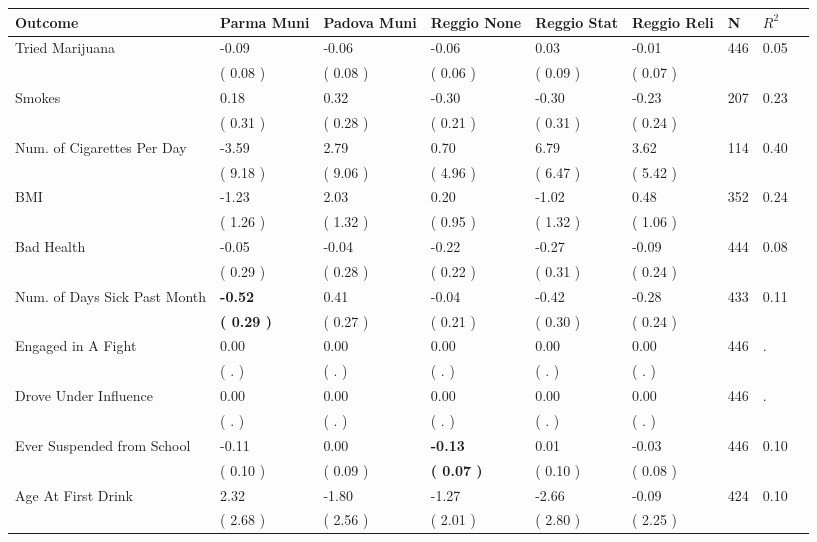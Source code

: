 \begin{tabular}{L{6.2cm} C{1.8cm} C{1.8cm} C{1.8cm} C{1.8cm} C{1.8cm} C{1.8cm} C{0.3cm} C{0.3cm}}
\toprule
 \textbf{Outcome} & \textbf{Parma Muni} & \textbf{Padova Muni} & \textbf{Reggio None} & \textbf{Reggio Stat} & \textbf{Reggio Reli} & \textbf{N} & \textbf{$ R^2$} \\
\midrule
Tried Marijuana &     -0.09 &     -0.06 &     -0.06 &      0.03 &     -0.01  & 446 &       0.05 \\ 
 & (     0.08 ) & (     0.08 ) & (     0.06 ) & (     0.09 ) & (     0.07 )  & \\
Smokes &      0.18 &      0.32 &     -0.30 &     -0.30 &     -0.23  & 207 &       0.23 \\ 
 & (     0.31 ) & (     0.28 ) & (     0.21 ) & (     0.31 ) & (     0.24 )  & \\
Num. of Cigarettes Per Day &     -3.59 &      2.79 &      0.70 &      6.79 &      3.62  & 114 &       0.40 \\ 
 & (     9.18 ) & (     9.06 ) & (     4.96 ) & (     6.47 ) & (     5.42 )  & \\
BMI &     -1.23 &      2.03 &      0.20 &     -1.02 &      0.48  & 352 &       0.24 \\ 
 & (     1.26 ) & (     1.32 ) & (     0.95 ) & (     1.32 ) & (     1.06 )  & \\
Bad Health &     -0.05 &     -0.04 &     -0.22 &     -0.27 &     -0.09  & 444 &       0.08 \\ 
 & (     0.29 ) & (     0.28 ) & (     0.22 ) & (     0.31 ) & (     0.24 )  & \\
Num. of Days Sick Past Month & \textbf{    -0.52} &      0.41 &     -0.04 &     -0.42 &     -0.28  & 433 &       0.11 \\ 
 & \textbf{(     0.29 )} & (     0.27 ) & (     0.21 ) & (     0.30 ) & (     0.24 )  & \\
Engaged in A Fight &      0.00 &      0.00 &      0.00 &      0.00 &      0.00  & 446 &          . \\ 
 & (        . ) & (        . ) & (        . ) & (        . ) & (        . )  & \\
Drove Under Influence &      0.00 &      0.00 &      0.00 &      0.00 &      0.00  & 446 &          . \\ 
 & (        . ) & (        . ) & (        . ) & (        . ) & (        . )  & \\
Ever Suspended from School &     -0.11 &      0.00 & \textbf{    -0.13} &      0.01 &     -0.03  & 446 &       0.10 \\ 
 & (     0.10 ) & (     0.09 ) & \textbf{(     0.07 )} & (     0.10 ) & (     0.08 )  & \\
Age At First Drink &      2.32 &     -1.80 &     -1.27 &     -2.66 &     -0.09  & 424 &       0.10 \\ 
 & (     2.68 ) & (     2.56 ) & (     2.01 ) & (     2.80 ) & (     2.25 )  & \\
\bottomrule
\end{tabular}
